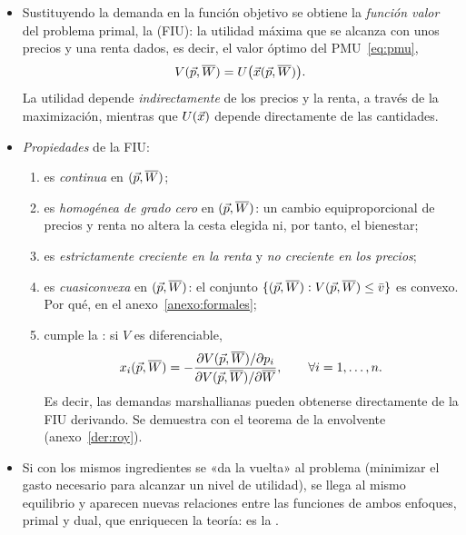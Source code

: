 \documentclass[11pt]{article}
\begin{document}
\begin{itemize}
\item Sustituyendo la demanda en la función objetivo se obtiene la \emph{función valor} del problema primal, la  (FIU): la utilidad máxima que se alcanza con unos precios y una renta dados, es decir, el valor óptimo del PMU~\eqref{eq:pmu},
  \begin{equation}
  V(\vec{p},\overline{W})=U\big(\vec{x}(\vec{p},\overline{W})\big). \label{eq:fiu}
  \end{equation}
  La utilidad depende \emph{indirectamente} de los precios y la renta, a través de la maximización, mientras que $U(\vec{x})$ depende directamente de las cantidades.
\item \emph{Propiedades} de la FIU\nocite{MasColellWhinstonGreen1995}:
  \begin{enumerate}
  \item es \emph{continua} en $(\vec{p},\overline{W})$;
  \item es \emph{homogénea de grado cero} en $(\vec{p},\overline{W})$: un cambio equiproporcional de precios y renta no altera la cesta elegida ni, por tanto, el bienestar;
  \item es \emph{estrictamente creciente en la renta} y \emph{no creciente en los precios};
  \item es \emph{cuasiconvexa} en $(\vec{p},\overline{W})$: el conjunto $\{(\vec{p},\overline{W}): V(\vec{p},\overline{W})\leq\bar v\}$ es convexo. Por qué, en el anexo~\ref{anexo:formales};
  \item cumple la  \textcite{Roy1947Distribution}: si $V$ es diferenciable,
    \begin{equation}
    x_i(\vec{p},\overline{W})=-\frac{\partial V(\vec{p},\overline{W})/\partial p_i}{\partial V(\vec{p},\overline{W})/\partial\overline{W}},\qquad\forall i=1,\dots,n. \label{eq:roy}
    \end{equation}
    Es decir, las demandas marshallianas pueden obtenerse directamente de la FIU derivando. Se demuestra con el teorema de la envolvente (anexo~\ref{der:roy}).
  \end{enumerate}
\item Si con los mismos ingredientes se «da la vuelta» al problema (minimizar el gasto necesario para alcanzar un nivel de utilidad), se llega al mismo equilibrio y aparecen nuevas relaciones entre las funciones de ambos enfoques, primal y dual, que enriquecen la teoría: es la  .
\end{itemize}
\end{document}

